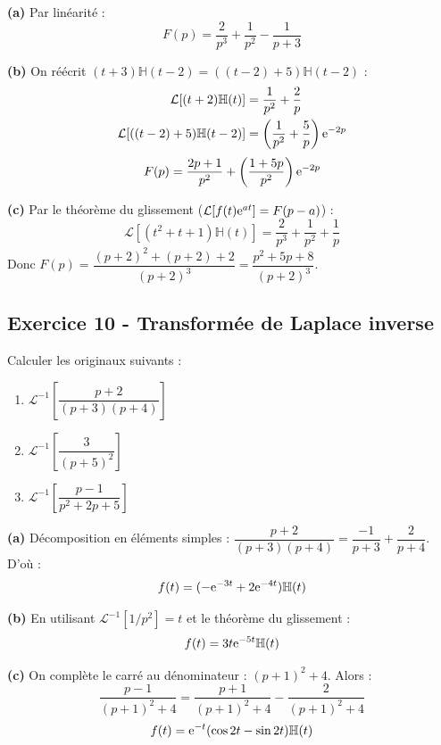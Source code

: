 \documentclass[12pt,a4paper]{article}
\begin{document}
\begin{boitecorrige}
\textbf{(a)} Par linéarité :
\[
F(p) = \frac{2}{p^3} + \frac{1}{p^2} - \frac{1}{p+3}
\]

\textbf{(b)} On réécrit $(t+3)\mathbb{H}(t-2) = ((t-2)+5)\mathbb{H}(t-2)$ :
\begin{align*}
\mathcal{L}[(t+2)\mathbb{H}(t)] &= \frac{1}{p^2} + \frac{2}{p} \\
\mathcal{L}[((t-2)+5)\mathbb{H}(t-2)] &= \left(\frac{1}{p^2}+\frac{5}{p}\right)\mathrm{e}^{-2p}
\end{align*}
\[
F(p) = \frac{2p+1}{p^2} + \left(\frac{1+5p}{p^2}\right)\mathrm{e}^{-2p}
\]

\textbf{(c)} Par le théorème du glissement ($\mathcal{L}[f(t)\mathrm{e}^{at}] = F(p-a)$) :
\[
\mathcal{L}[(t^2+t+1)\mathbb{H}(t)] = \frac{2}{p^3}+\frac{1}{p^2}+\frac{1}{p}
\]
Donc $F(p) = \dfrac{(p+2)^2+(p+2)+2}{(p+2)^3} = \dfrac{p^2+5p+8}{(p+2)^3}$.
\end{boitecorrige}

\subsection*{Exercice 10 - Transformée de Laplace inverse \niveau{\moyen}}

\begin{boiteexercice}
Calculer les originaux suivants :
\begin{enumerate}[label=(\alph*)]
  \item $\mathcal{L}^{-1}\!\left[\dfrac{p+2}{(p+3)(p+4)}\right]$
  \item $\mathcal{L}^{-1}\!\left[\dfrac{3}{(p+5)^2}\right]$
  \item $\mathcal{L}^{-1}\!\left[\dfrac{p-1}{p^2+2p+5}\right]$
\end{enumerate}
\end{boiteexercice}

\begin{boitecorrige}
\textbf{(a)} Décomposition en éléments simples : $\dfrac{p+2}{(p+3)(p+4)} = \dfrac{-1}{p+3}+\dfrac{2}{p+4}$. D'où :
\[
f(t) = (-\mathrm{e}^{-3t}+2\mathrm{e}^{-4t})\mathbb{H}(t)
\]

\textbf{(b)} En utilisant $\mathcal{L}^{-1}[1/p^2] = t$ et le théorème du glissement :
\[
f(t) = 3t\mathrm{e}^{-5t}\mathbb{H}(t)
\]

\textbf{(c)} On complète le carré au dénominateur : $(p+1)^2+4$. Alors :
\[
\frac{p-1}{(p+1)^2+4} = \frac{p+1}{(p+1)^2+4} - \frac{2}{(p+1)^2+4}
\]
\[
f(t) = \mathrm{e}^{-t}(\cos 2t - \sin 2t)\mathbb{H}(t)
\]
\end{boitecorrige}
\end{document}
